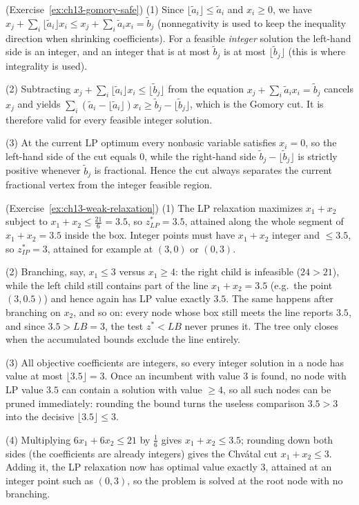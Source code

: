 \begin{solution}(Exercise~\ref{ex:ch13-gomory-safe})
(1) Since $\lfloor \tilde a_i \rfloor \leq \tilde a_i$ and $x_i \geq 0$, we
have $x_j + \sum_i \lfloor \tilde a_i \rfloor x_i \leq
x_j + \sum_i \tilde a_i x_i = \tilde b_j$ (nonnegativity is used to keep the
inequality direction when shrinking coefficients).  For a feasible
\emph{integer} solution the left-hand side is an integer, and an integer that
is at most $\tilde b_j$ is at most $\lfloor \tilde b_j \rfloor$ (this is
where integrality is used).

(2) Subtracting
$x_j + \sum_i \lfloor \tilde a_i \rfloor x_i \leq \lfloor \tilde b_j \rfloor$
from the equation $x_j + \sum_i \tilde a_i x_i = \tilde b_j$ cancels $x_j$
and yields
$\sum_i (\tilde a_i - \lfloor \tilde a_i \rfloor) x_i \geq
\tilde b_j - \lfloor \tilde b_j \rfloor$, which is the Gomory cut.  It is
therefore valid for every feasible integer solution.

(3) At the current LP optimum every nonbasic variable satisfies $x_i = 0$,
so the left-hand side of the cut equals $0$, while the right-hand side
$\tilde b_j - \lfloor \tilde b_j \rfloor$ is strictly positive whenever
$\tilde b_j$ is fractional.  Hence the cut always separates the current
fractional vertex from the integer feasible region.
\end{solution}

\begin{solution}(Exercise~\ref{ex:ch13-weak-relaxation})
(1) The LP relaxation maximizes $x_1 + x_2$ subject to
$x_1 + x_2 \leq \tfrac{21}{6} = 3.5$, so $z^*_{LP} = 3.5$, attained along the
whole segment of $x_1 + x_2 = 3.5$ inside the box.  Integer points must have
$x_1 + x_2$ integer and $\leq 3.5$, so $z^*_{IP} = 3$, attained for example
at $(3, 0)$ or $(0, 3)$.

(2) Branching, say, $x_1 \leq 3$ versus $x_1 \geq 4$: the right child is
infeasible ($24 > 21$), while the left child still contains part of the line
$x_1 + x_2 = 3.5$ (e.g.\ the point $(3, 0.5)$) and hence again has LP value
exactly $3.5$.  The same happens after branching on $x_2$, and so on: every
node whose box still meets the line reports $3.5$, and since
$3.5 > LB = 3$, the test $z^* < LB$ never prunes it.  The tree only closes
when the accumulated bounds exclude the line entirely.

(3) All objective coefficients are integers, so every integer solution in a
node has value at most $\lfloor 3.5 \rfloor = 3$.  Once an incumbent with
value $3$ is found, no node with LP value $3.5$ can contain a solution with
value $\geq 4$, so all such nodes can be pruned immediately: rounding the
bound turns the useless comparison $3.5 > 3$ into the decisive
$\lfloor 3.5 \rfloor \leq 3$.

(4) Multiplying $6x_1 + 6x_2 \leq 21$ by $\tfrac16$ gives
$x_1 + x_2 \leq 3.5$; rounding down both sides (the coefficients are already
integers) gives the Chv\'atal cut $x_1 + x_2 \leq 3$.  Adding it, the LP
relaxation now has optimal value exactly $3$, attained at an integer point
such as $(0, 3)$, so the problem is solved at the root node with no
branching.
\end{solution}

